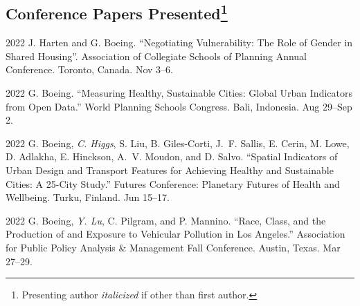 \documentclass[12pt,letterpaper]{report}
\begin{document}
    \subsection*{Conference Papers Presented\footnote{Presenting author \textit{italicized} if other than first author.}}

    \begin{tablist}
    	
    	
    	
    	\item[2022] \tab{}J. Harten and G. Boeing. \enquote{Negotiating Vulnerability: The Role of Gender in Shared Housing}. Association of Collegiate Schools of Planning Annual Conference. Toronto, Canada. Nov 3--6.

        \item[2022] \tab{}G. Boeing. \enquote{Measuring Healthy, Sustainable Cities: Global Urban Indicators from Open Data.} World Planning Schools Congress. Bali, Indonesia. Aug 29--Sep 2.

        \item[2022] \tab{}G. Boeing, \textit{C. Higgs}, S. Liu, B. Giles-Corti, J.~F. Sallis, E. Cerin, M. Lowe, D. Adlakha, E. Hinckson, A.~V. Moudon, and D. Salvo. \enquote{Spatial Indicators of Urban Design and Transport Features for Achieving Healthy and Sustainable Cities: A 25-City Study.} Futures Conference: Planetary Futures of Health and Wellbeing. Turku, Finland. Jun 15--17.

        \item[2022] \tab{}G. Boeing, \textit{Y. Lu}, C. Pilgram, and P. Mannino. \enquote{Race, Class, and the Production of and Exposure to Vehicular Pollution in Los Angeles.} Association for Public Policy Analysis \& Management Fall Conference. Austin, Texas. Mar 27--29.


\end{tablist}
\end{document}
